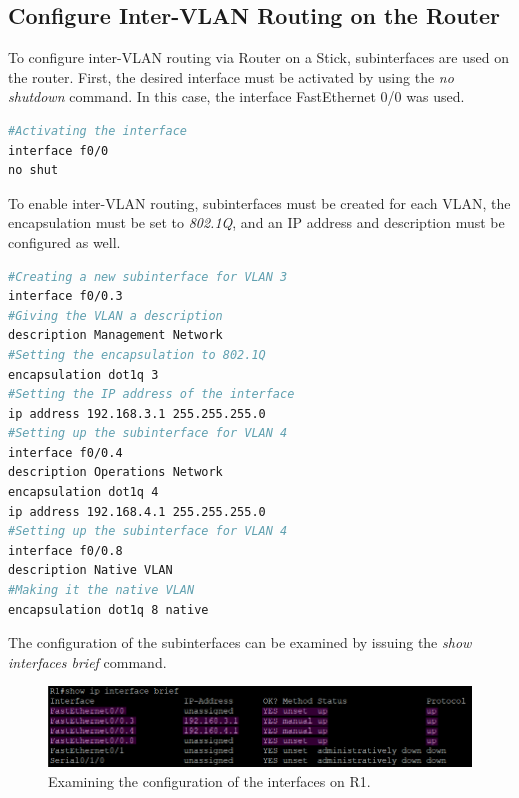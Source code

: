 \documentclass[a4paper]{article}
\newcommand{\ii}{\textit}
\begin{document}
\subsection{Configure Inter-VLAN Routing on the Router}
To configure inter-VLAN routing via Router on a Stick, subinterfaces are used on the router. First, the desired interface must be activated by using the \ii{no shutdown} command. In this case, the interface FastEthernet 0/0 was used.
\begin{lstlisting}[language=bash]
#Activating the interface
interface f0/0	
no shut
\end{lstlisting}
To enable inter-VLAN routing, subinterfaces must be created for each VLAN, the encapsulation must be set to \ii{802.1Q}, and an IP address and description must be configured as well.
\begin{lstlisting}[language=bash]
#Creating a new subinterface for VLAN 3
interface f0/0.3
#Giving the VLAN a description
description Management Network
#Setting the encapsulation to 802.1Q
encapsulation dot1q 3
#Setting the IP address of the interface
ip address 192.168.3.1 255.255.255.0
#Setting up the subinterface for VLAN 4
interface f0/0.4
description Operations Network
encapsulation dot1q 4
ip address 192.168.4.1 255.255.255.0
#Setting up the subinterface for VLAN 4
interface f0/0.8
description Native VLAN
#Making it the native VLAN
encapsulation dot1q 8 native
\end{lstlisting}
\newpage
The configuration of the subinterfaces can be examined by issuing the \ii{show interfaces brief} command.
\begin{figure}[!htbp]
	\includegraphics[scale=0.55]{images/R1_show_int_brief.png}
	\centering
	\caption{Examining the configuration of the interfaces on R1.}
\end{figure}
\end{document}
